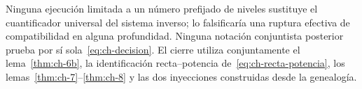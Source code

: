 Ninguna ejecución limitada a un número prefijado de niveles sustituye el
cuantificador universal del sistema inverso; lo falsificaría una ruptura
efectiva de compatibilidad en alguna profundidad. Ninguna notación conjuntista
posterior prueba por sí sola~\eqref{eq:ch-decision}. El cierre utiliza conjuntamente el
lema~\ref{thm:ch-6b}, la identificación recta--potencia de~\eqref{eq:ch-recta-potencia}, los
lemas~\ref{thm:ch-7}--\ref{thm:ch-8} y las dos inyecciones construidas desde
la genealogía.

